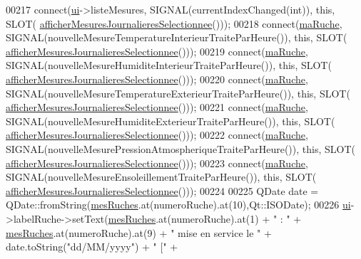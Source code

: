 \begin{DoxyCode}
00217         connect(\hyperlink{class_ruche_ihm_a64786058bd7f88ca2f1e9743bb27c25b}{ui}->listeMesures, SIGNAL(currentIndexChanged(\textcolor{keywordtype}{int})), \textcolor{keyword}{this}, SLOT(
      \hyperlink{class_ruche_ihm_a7f66af552d9e7ba0d00437ff3b330706}{afficherMesuresJournalieresSelectionnee}()));
00218         connect(\hyperlink{class_ruche_ihm_a43a6b1fa31f4fba58d919daae3707b38}{maRuche}, SIGNAL(nouvelleMesureTemperatureInterieurTraiteParHeure()), \textcolor{keyword}{this}, SLOT(
      \hyperlink{class_ruche_ihm_a7f66af552d9e7ba0d00437ff3b330706}{afficherMesuresJournalieresSelectionnee}()));
00219         connect(\hyperlink{class_ruche_ihm_a43a6b1fa31f4fba58d919daae3707b38}{maRuche}, SIGNAL(nouvelleMesureHumiditeInterieurTraiteParHeure()), \textcolor{keyword}{this}, SLOT(
      \hyperlink{class_ruche_ihm_a7f66af552d9e7ba0d00437ff3b330706}{afficherMesuresJournalieresSelectionnee}()));
00220         connect(\hyperlink{class_ruche_ihm_a43a6b1fa31f4fba58d919daae3707b38}{maRuche}, SIGNAL(nouvelleMesureTemperatureExterieurTraiteParHeure()), \textcolor{keyword}{this}, SLOT(
      \hyperlink{class_ruche_ihm_a7f66af552d9e7ba0d00437ff3b330706}{afficherMesuresJournalieresSelectionnee}()));
00221         connect(\hyperlink{class_ruche_ihm_a43a6b1fa31f4fba58d919daae3707b38}{maRuche}, SIGNAL(nouvelleMesureHumiditeExterieurTraiteParHeure()), \textcolor{keyword}{this}, SLOT(
      \hyperlink{class_ruche_ihm_a7f66af552d9e7ba0d00437ff3b330706}{afficherMesuresJournalieresSelectionnee}()));
00222         connect(\hyperlink{class_ruche_ihm_a43a6b1fa31f4fba58d919daae3707b38}{maRuche}, SIGNAL(nouvelleMesurePressionAtmospheriqueTraiteParHeure()), \textcolor{keyword}{this}, SLOT(
      \hyperlink{class_ruche_ihm_a7f66af552d9e7ba0d00437ff3b330706}{afficherMesuresJournalieresSelectionnee}()));
00223         connect(\hyperlink{class_ruche_ihm_a43a6b1fa31f4fba58d919daae3707b38}{maRuche}, SIGNAL(nouvelleMesureEnsoleillementTraiteParHeure()), \textcolor{keyword}{this}, SLOT(
      \hyperlink{class_ruche_ihm_a7f66af552d9e7ba0d00437ff3b330706}{afficherMesuresJournalieresSelectionnee}()));
00224 
00225         QDate date = QDate::fromString(\hyperlink{class_ruche_ihm_ab7741fa67b19cbb2da7eb12c58cf83c1}{mesRuches}.at(numeroRuche).at(10),Qt::ISODate);
00226         \hyperlink{class_ruche_ihm_a64786058bd7f88ca2f1e9743bb27c25b}{ui}->labelRuche->setText(\hyperlink{class_ruche_ihm_ab7741fa67b19cbb2da7eb12c58cf83c1}{mesRuches}.at(numeroRuche).at(1) + \textcolor{stringliteral}{" : "}  + 
      \hyperlink{class_ruche_ihm_ab7741fa67b19cbb2da7eb12c58cf83c1}{mesRuches}.at(numeroRuche).at(9) + \textcolor{stringliteral}{" mise en service le "} + date.toString(\textcolor{stringliteral}{"dd/MM/yyyy"}) + \textcolor{stringliteral}{" ["} + 

\end{DoxyCode}
